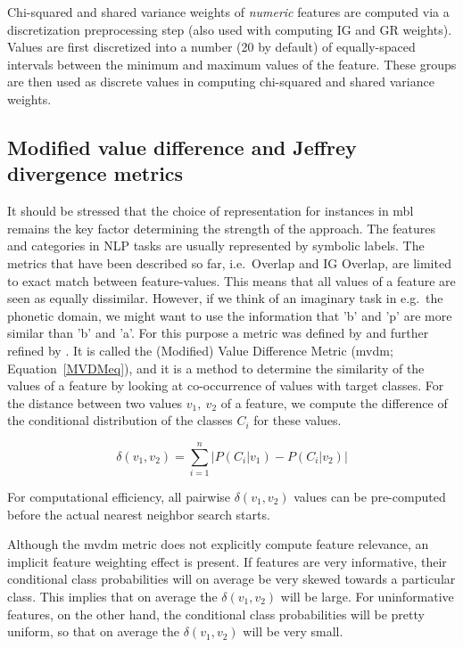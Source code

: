\documentclass{report}
\begin{document}
Chi-squared and shared variance weights of {\em numeric}\/ features are
computed via a discretization preprocessing step (also used with
computing IG and GR weights). Values are first discretized into a
number (20 by default) of equally-spaced intervals between the
minimum and maximum values of the feature. These groups are then used
as discrete values in computing chi-squared and shared variance weights.

\subsection{Modified value difference and Jeffrey divergence metrics}
\label{mvdm}

It should be stressed that the choice of representation for instances
in {\sc mbl} remains the key factor determining the strength of the
approach. The features and categories in NLP tasks are usually
represented by symbolic labels. The metrics that have been described
so far, i.e.~Overlap and IG Overlap, are limited to exact match
between feature-values. This means that all values of a feature are
seen as equally dissimilar. However, if we think of an imaginary task
in e.g.~the phonetic domain, we might want to use the information that
'b' and 'p' are more similar than 'b' and 'a'. For this purpose a
metric was defined by  and further refined by
. It is called the (Modified) Value Difference
Metric ({\sc mvdm}; Equation~\ref{MVDMeq}), and it is a method to
determine the similarity of the values of a feature by looking at
co-occurrence of values with target classes. For the distance between
two values $v_{1},\ v_{2}$ of a feature, we compute the difference of
the conditional distribution of the classes $C_{i}$ for these values.

\begin{equation}
\delta(v_{1}, v_{2}) = \sum_{i=1}^{n} \left| P(C_{i}|v_{1}) - P(C_{i}|v_{2})
\right|
\label{MVDMeq}
\end{equation}

For computational efficiency, all pairwise $\delta(v_{1}, v_{2})$
values can be pre-comput\-ed before the actual nearest neighbor search
starts.

Although the {\sc mvdm} metric does not explicitly compute feature
relevance, an implicit feature weighting effect is present. If
features are very informative, their conditional class probabilities
will on average be very skewed towards a particular class. This
implies that on average the $\delta(v_{1}, v_{2})$ will be large. For
uninformative features, on the other hand, the conditional class
probabilities will be pretty uniform, so that on average the
$\delta(v_{1}, v_{2})$ will be very small.
\end{document}
